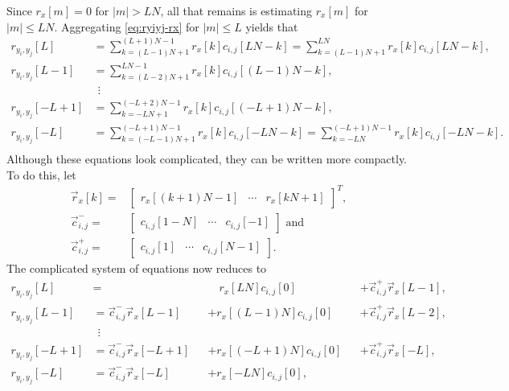 \documentclass[a4paper, openany, oneside]{memoir}
\begin{document}
Since $r_x[m]=0$ for $|m| > LN$, all that remains is estimating $r_x[m]$ for $|m| \le LN$. Aggregating \cref{eq:ryiyj-rx} for $|m| \le L$ yields that
\begin{align*}
    r_{y_i,y_j}[L] &= \sum_{k=(L-1)N+1}^{(L+1)N-1}r_{x}[k]c_{i,j}[LN-k] = \sum_{k=(L-1)N+1}^{LN}r_{x}[k]c_{i,j}[LN-k], \\
    r_{y_i,y_j}[L-1] &= \sum_{k=(L-2)N+1}^{LN-1}r_{x}[k]c_{i,j}[(L-1)N-k], \\
    &~~\vdots \\
    r_{y_i,y_j}[-L+1] &= \sum_{k=-LN+1}^{(-L+2)N-1}r_{x}[k]c_{i,j}[(-L+1)N-k], \\
    r_{y_i,y_j}[-L] &= \sum_{k=(-L-1)N+1}^{(-L+1)N-1}r_{x}[k]c_{i,j}[-LN-k] = \sum_{k=-LN}^{(-L+1)N-1}r_{x}[k]c_{i,j}[-LN-k]. \\
\end{align*}
Although these equations look complicated, they can be written more compactly. To do this, let
\begin{align*}
    \vec{r}_x[k] =& \begin{bmatrix}
        r_x[(k+1)N-1] & \cdots & r_x[kN+1]
    \end{bmatrix}^T, \\
    \vec{c}^{-}_{i,j} =& \begin{bmatrix}
        c_{i,j}[1-N] & \cdots & c_{i,j}[-1]
    \end{bmatrix} \text{ and } \\
    \vec{c}^{+}_{i,j} =& \begin{bmatrix}
        c_{i,j}[1] & \cdots & c_{i,j}[N-1]
    \end{bmatrix}.
\end{align*}
The complicated system of equations now reduces to
\begin{align*}
    r_{y_i,y_j}[L] &= &&\hspace{12pt}r_x[LN] c_{i,j}[0] &&+ \vec{c}_{i,j}^+ \vec{r}_x[L-1] , \\
    r_{y_i,y_j}[L-1] &= \vec{c}_{i,j}^{-} \vec{r}_x[L-1] &&+ r_x[(L-1)N] c_{i,j}[0] &&+ \vec{c}_{i,j}^{+} \vec{r}_x[L-2], \\
    &~~\vdots \\
    r_{y_i,y_j}[-L+1] &= \vec{c}_{i,j}^{-}\vec{r}_x[-L+1] &&+ r_x[(-L+1)N] c_{i,j}[0] &&+ \vec{c}_{i,j}^{+}\vec{r}_x[-L], \\
    r_{y_i,y_j}[-L] &= \vec{c}_{i,j}^{-} \vec{r}_x[-L] &&+ r_x[-LN] c_{i,j}[0],
\end{align*}
\end{document}
